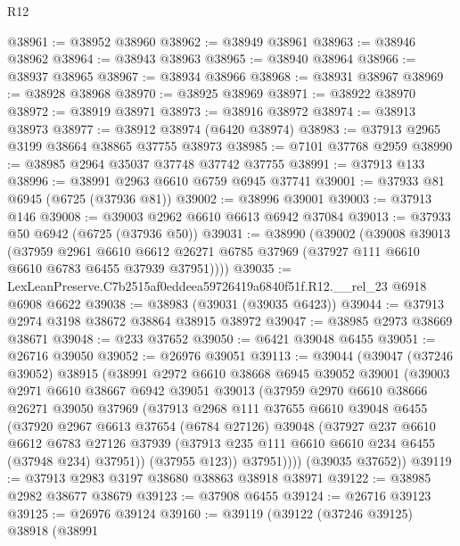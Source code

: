 \begin{lexlean}{R12}
\begin{coremodule}
@38961 := @38952 @38960
@38962 := @38949 @38961
@38963 := @38946 @38962
@38964 := @38943 @38963
@38965 := @38940 @38964
@38966 := @38937 @38965
@38967 := @38934 @38966
@38968 := @38931 @38967
@38969 := @38928 @38968
@38970 := @38925 @38969
@38971 := @38922 @38970
@38972 := @38919 @38971
@38973 := @38916 @38972
@38974 := @38913 @38973
@38977 := @38912 @38974 (@6420 @38974)
@38983 := @37913 @2965 @3199 @38664 @38865 @37755 @38973
@38985 := @7101 @37768 @2959
@38990 := @38985 @2964 @35037 @37748 @37742 @37755
@38991 := @37913 @133
@38996 := @38991 @2963 @6610 @6759 @6945 @37741
@39001 := @37933 @81 @6945 (@6725 (@37936 @81))
@39002 := @38996 @39001
@39003 := @37913 @146
@39008 := @39003 @2962 @6610 @6613 @6942 @37084
@39013 := @37933 @50 @6942 (@6725 (@37936 @50))
@39031 := @38990
    (@39002
      (@39008
        @39013
        (@37959
          @2961
          @6610
          @6612
          @26271
          @6785
          @37969
          (@37927 @111 @6610 @6610 @6783 @6455 @37939 @37951))))
@39035 := LexLeanPreserve.C7b2515af0eddeea59726419a6840f51f.R12.__rel_23 @6918 @6908 @6622
@39038 := @38983 (@39031 (@39035 @6423))
@39044 := @37913 @2974 @3198 @38672 @38864 @38915 @38972
@39047 := @38985 @2973 @38669 @38671
@39048 := @233 @37652
@39050 := @6421 @39048 @6455
@39051 := @26716 @39050
@39052 := @26976 @39051
@39113 := @39044
    (@39047
      (@37246 @39052)
      @38915
      (@38991
        @2972
        @6610
        @38668
        @6945
        @39052
        @39001
        (@39003
          @2971
          @6610
          @38667
          @6942
          @39051
          @39013
          (@37959
            @2970
            @6610
            @38666
            @26271
            @39050
            @37969
            (@37913
              @2968
              @111
              @37655
              @6610
              @39048
              @6455
              (@37920
                @2967
                @6613
                @37654
                (@6784 @27126)
                @39048
                (@37927
                  @237
                  @6610
                  @6612
                  @6783
                  @27126
                  @37939
                  (@37913 @235 @111 @6610 @6610 @234 @6455 (@37948 @234) @37951))
                (@37955 @123))
              @37951))))
      (@39035 @37652))
@39119 := @37913 @2983 @3197 @38680 @38863 @38918 @38971
@39122 := @38985 @2982 @38677 @38679
@39123 := @37908 @6455
@39124 := @26716 @39123
@39125 := @26976 @39124
@39160 := @39119
    (@39122
      (@37246 @39125)
      @38918
      (@38991

\end{coremodule}
\end{lexlean}
